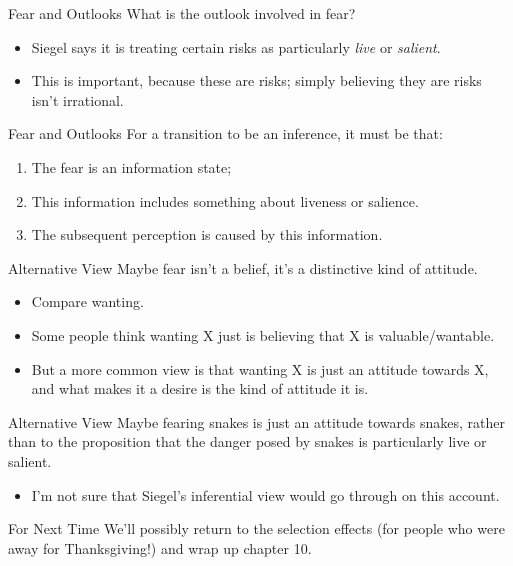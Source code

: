 \documentclass[
  17pt,
  letterpaper,
  ignorenonframetext,
  aspectratio=169,
  xcolor={dvipsnames}]{beamer}
\providecommand{\tightlist}{%
  \setlength{\itemsep}{0pt}\setlength{\parskip}{0pt}}\usepackage{longtable,booktabs,array}
\begin{document}
\begin{frame}{Fear and Outlooks}
\protect\hypertarget{fear-and-outlooks}{}
What is the outlook involved in fear?

\begin{itemize}[<+->]
\tightlist
\item
  Siegel says it is treating certain risks as particularly \emph{live}
  or \emph{salient}.
\item
  This is important, because these are risks; simply believing they are
  risks isn't irrational.
\end{itemize}
\end{frame}

\begin{frame}{Fear and Outlooks}
\protect\hypertarget{fear-and-outlooks-1}{}
For a transition to be an inference, it must be that:

\begin{enumerate}[<+->]
\tightlist
\item
  The fear is an information state;
\item
  This information includes something about liveness or salience.
\item
  The subsequent perception is caused by this information.
\end{enumerate}
\end{frame}

\begin{frame}{Alternative View}
\protect\hypertarget{alternative-view}{}
Maybe fear isn't a belief, it's a distinctive kind of attitude.

\begin{itemize}[<+->]
\tightlist
\item
  Compare wanting.
\item
  Some people think wanting X just is believing that X is
  valuable/wantable.
\item
  But a more common view is that wanting X is just an attitude towards
  X, and what makes it a desire is the kind of attitude it is.
\end{itemize}
\end{frame}

\begin{frame}{Alternative View}
\protect\hypertarget{alternative-view-1}{}
Maybe fearing snakes is just an attitude towards snakes, rather than to
the proposition that the danger posed by snakes is particularly live or
salient.

\begin{itemize}[<+->]
\tightlist
\item
  I'm not sure that Siegel's inferential view would go through on this
  account.
\end{itemize}
\end{frame}

\begin{frame}{For Next Time}
\protect\hypertarget{for-next-time}{}
We'll possibly return to the selection effects (for people who were away
for Thanksgiving!) and wrap up chapter 10.
\end{frame}
\end{document}
